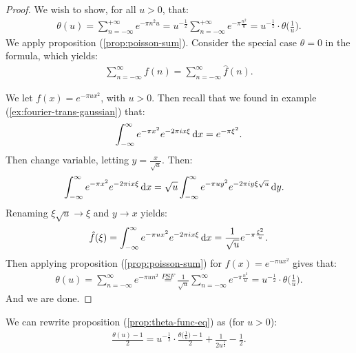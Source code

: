 \begin{proof}
We wish to show, for all $u>0$, that:
\begin{align*}
    \theta(u) = \sum_{n=-\infty}^{+\infty} e^{- \pi n^2 u} = u^{- \frac{1}{2}} \sum_{n=-\infty}^{+\infty} e^{- \pi \frac{n^2}{u}} = u^{- \frac{1}{2}} \cdot  \theta\big(\tfrac{1}{u}\big).
\end{align*}
We apply proposition (\ref{prop:poisson-sum}). Consider the special case $\theta = 0$ in the formula, which yields:
\begin{align*}
    \sum_{n=-\infty}^\infty f( n) = \sum_{n=-\infty}^\infty \hat{f}(n).
\end{align*}

We let $f(x) = e^{-\pi u x^2}$, with $u>0$. Then recall that we found in example (\ref{ex:fourier-trans-gaussian}) that:
\begin{align*}
    \int_{-\infty}^\infty e^{-\pi x^2} e^{-2\pi i x \xi}  \dif x = e^{-\pi \xi ^2 }.
\end{align*}
Then change variable, letting $y = \frac{x}{\sqrt{u}}$. Then:
\begin{align*}
    \int_{-\infty}^\infty e^{-\pi x^2} e^{-2\pi i x \xi}  \dif x &= \sqrt{u} \int_{-\infty}^\infty e^{-\pi u y^2} e^{-2\pi i y \xi \sqrt{u}}  \dif y.
\end{align*}
Renaming $\xi \sqrt{u} \xrightarrow{} \xi$ and $y \xrightarrow{} x$ yields:
\begin{align*}
    \hat{f}(\xi)=\int_{-\infty}^\infty e^{-\pi u x^2} e^{-2\pi i x \xi}  \dif x = \frac{1}{\sqrt{u}} e^{- \pi \frac{\xi^2}{u}}.
\end{align*}
Then applying proposition (\ref{prop:poisson-sum}) for $f(x) = e^{- \pi u x^2}$ gives that:
\begin{align*}
    \theta(u) = \sum_{n=-\infty}^\infty e^{- \pi u n^2} \overset{PSF}{=} \frac{1}{\sqrt{u} } \sum_{n=-\infty}^\infty e^{- \pi \frac{n^2}{u}} = u^{- \frac{1}{2}} \cdot  \theta\big(\tfrac{1}{u}\big).
\end{align*}
And we are done.

\end{proof}







\begin{remark}\label{rem:theta-func-eq-different-form}
We can rewrite proposition (\ref{prop:theta-func-eq}) as (for $u>0$):
\begin{align*}
    \frac{\theta(u) - 1}{2} = u^{- \frac{1}{2}} \cdot \frac{\theta\big(\tfrac{1}{u}\big) - 1}{2} + \frac{1}{2 u^{\frac{1}{2}}} - \frac{1}{2}.
\end{align*}
\end{remark}

